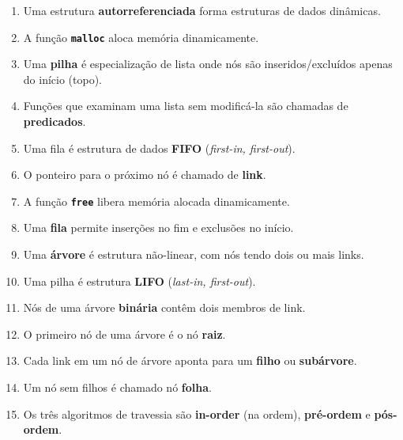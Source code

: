 \documentclass[12pt,a4paper]{article}
\begin{document}
\begin{respostabox}
\begin{enumerate}[label=\textbf{\alph*)}]

\item Uma estrutura \textbf{autorreferenciada} forma estruturas de dados dinâmicas.

\item A função \textbf{\texttt{malloc}} aloca memória dinamicamente.

\item Uma \textbf{pilha} é especialização de lista onde nós são inseridos/excluídos
apenas do início (topo).

\item Funções que examinam uma lista sem modificá-la são chamadas de \textbf{predicados}.

\item Uma fila é estrutura de dados \textbf{FIFO} (\textit{first-in, first-out}).

\item O ponteiro para o próximo nó é chamado de \textbf{link}.

\item A função \textbf{\texttt{free}} libera memória alocada dinamicamente.

\item Uma \textbf{fila} permite inserções no fim e exclusões no início.

\item Uma \textbf{árvore} é estrutura não-linear, com nós tendo dois ou mais links.

\item Uma pilha é estrutura \textbf{LIFO} (\textit{last-in, first-out}).

\item Nós de uma árvore \textbf{binária} contêm dois membros de link.

\item O primeiro nó de uma árvore é o nó \textbf{raiz}.

\item Cada link em um nó de árvore aponta para um \textbf{filho} ou \textbf{subárvore}.

\item Um nó sem filhos é chamado nó \textbf{folha}.

\item Os três algoritmos de travessia são \textbf{in-order} (na ordem),
\textbf{pré-ordem} e \textbf{pós-ordem}.

\end{enumerate}


\end{respostabox}
\end{document}
